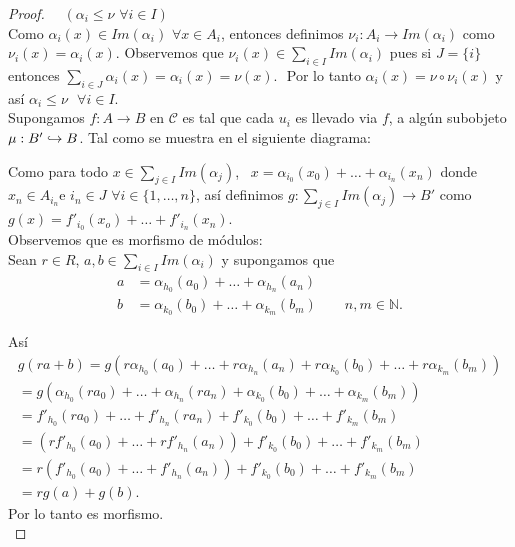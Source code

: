 \documentclass{article}
\begin{document}
\begin{enumerate}[label=\textbf{Ej \arabic*.}]
\begin{proof}
			$\quad  (\alpha_i\leq \nu\,\,\forall i\in I)$\\
			
			Como $\alpha_i(x)\in Im(\alpha_i)\,\,\forall x\in A_i$, entonces definimos $\nu_i : A_i\to Im(\alpha_i)$ como $\nu_i(x)=\alpha_i(x)$.
			Observemos que $\nu_i(x)\in \displaystyle\sum_{i\in I}Im(\alpha_i)$ pues si $J=\{i\}$ entonces 
			$\displaystyle\sum_{i\in J}\alpha_i(x)=\alpha_i(x)=\nu(x)$.\,\, Por lo tanto $\alpha_i(x)=\nu\circ\nu_i(x)$ y así $\alpha_i\leq \nu\,\,\,\,\forall i\in I$.\\
			
			\quad  Supongamos $f:A\to B$ en $\mathscr{C}$ es tal que cada $u_i$ es llevado via $f$, a algún subobjeto $\mu\catarrow{}{B'}{B}{m}$. 
			Tal como se muestra en el siguiente diagrama:
			
			
			
			
			
			Como para todo $x\in \displaystyle\sum_{j\in I}Im(\alpha_j)$, \,\,\,$x=\alpha_{i_0}(x_0)+\ldots+\alpha_{i_n}(x_n)$ donde $x_n\in A_{i_n}$\quad e\quad
			$i_n\in J\,\, \forall i\in\{1,\ldots,n\}$, así definimos $g : \displaystyle\sum_{j\in I}Im(\alpha_j)\longrightarrow B'$ como 
			$g(x)=f'_{i_0}(x_o)+\ldots+f'_{i_n}(x_n)$.\\
			Observemos que es morfismo de módulos:\\
			
			Sean $r\in R$, $a,b\in \displaystyle\sum_{i\in I}Im(\alpha_i)$ y supongamos que 
			\begin{align*}
				a&=\alpha_{h_0}(a_0)+\ldots+\alpha_{h_n}(a_n)\\
				b&=\alpha_{k_0}(b_0)+\ldots+\alpha_{k_m}(b_m)\qquad n,m\in \mathbb{N}.
			\end{align*}
			
			Así 
			\begin{gather*}
				g(ra+b)=g\left(r\alpha_{h_0}(a_0)+\ldots+r\alpha_{h_n}(a_n)+r\alpha_{k_0}(b_0)+\ldots+r\alpha_{k_m}(b_m)\right)\\
				=g\left(\alpha_{h_0}(ra_0)+\ldots+\alpha_{h_n}(ra_n)+\alpha_{k_0}(b_0)+\ldots+\alpha_{k_m}(b_m)\right)\\
				=f'_{h_0}(ra_0)+\ldots+f'_{h_n}(ra_n)+f'_{k_0}(b_0)+\ldots+f'_{k_m}(b_m)\\
				=\left(rf'_{h_0}(a_0)+\ldots+rf'_{h_n}(a_n)\right)+f'_{k_0}(b_0)+\ldots+f'_{k_m}(b_m)\\
				=r\left(f'_{h_0}(a_0)+\ldots+f'_{h_n}(a_n)\right)+f'_{k_0}(b_0)+\ldots+f'_{k_m}(b_m)\\
				=rg(a)+g(b).
			\end{gather*}
			Por lo tanto es morfismo.\\
			

\end{proof}
\end{enumerate}
\end{document}
